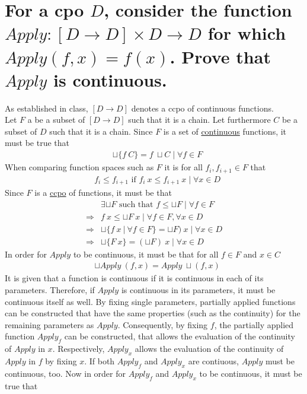 \section{For a cpo $D$, consider the function $Apply: [D \rightarrow D] \times D \rightarrow D$ for which $Apply (f, x) = f(x)$. Prove that $Apply$ is continuous.}

As established in class, $[D \rightarrow D]$  denotes a ccpo of continuous functions. \\
Let $F$ a be a subset of $[D \rightarrow D]$ such that it is a chain. Let furthermore $C$ be a subset of $D$ such that it is a chain. Since $F$ is a set of \underline{continuous} functions, it must be true that
\begin{align}
	&  \sqcup \{ f \ C \} = f \ \sqcup C \mid \forall f \in F \label{eq:cont:given:x}
\end{align}
When comparing function spaces such as $F$ it is for all $f_i,f_{i+1} \in F$ that
\begin{align}
	& f_i \leq f_{i+1} \text{ if } f_i \ x \leq f_{i+1} \ x \mid \forall x \in D
\end{align}
Since $F$ is a \underline{ccpo} of functions, it must be that
\begin{align}
						& \exists \sqcup F \text{ such that } f \leq \sqcup F \mid \forall f \in F \\
\Rightarrow &  f \ x \leq \sqcup F \ x  \mid \forall f \in F, \forall x \in D \\
\Rightarrow	& \sqcup \{ f \ x \ | \ \forall f \in F \} = \sqcup F ) \ x \mid \forall x \in D \\
\Rightarrow	& \sqcup \{ F \ x \} = (\sqcup F) \ x \mid \forall x \in D \label{eq:cont:given:f}
\end{align}
In order for $Apply$ to be continuous, it must be that for all $f \in F$ and $x \in C$
\begin{align}
	& \sqcup Apply \ (f,x) = Apply \ \sqcup (f,x)
\end{align}
It is given that a function is continuous if it is continuous in each of its parameters. Therefore, if $Apply$ is continuous in its parameters, it must be continuous itself as well. By fixing single parameters, partially applied functions can be constructed that have the same properties (such as the continuity) for the remaining parameters as $Apply$. Consequently, by fixing $f$, the partially applied function $Apply_f$ can be constructed, that allows the evaluation of the continuity of $Apply$ in $x$. Respectively, $Apply_x$ allows the evaluation of the continuity of $Apply$ in $f$ by fixing $x$. If both $Apply_f$ and $Apply_x$ are contiuous, $Apply$ must be continuous, too. Now in order for $Apply_f$ and $Apply_x$ to be continuous, it must be true that
